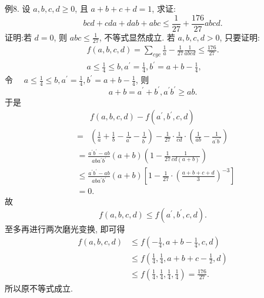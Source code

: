 例8. 设 $a, b, c, d \geqslant 0$, 且 $a+b+c+d=1$, 求证:
$$
b c d+c d a+d a b+a b c \leqslant \frac{1}{27}+\frac{176}{27} a b c d .
$$
证明:若 $d=0$, 则 $a b c \leqslant \frac{1}{27}$, 不等式显然成立.
若 $a, b, c, d>0$, 只要证明:
$$
\begin{gathered}
f(a, b, c, d)=\sum_{c y c} \frac{1}{a}-\frac{1}{27} \frac{1}{a b c d} \leqslant \frac{176}{27} . \\
a \leqslant \frac{1}{4} \leqslant b, a^{\prime}=\frac{1}{4}, b^{\prime}=a+b-\frac{1}{4},
\end{gathered}
$$
令 $\quad a \leqslant \frac{1}{4} \leqslant b, a^{\prime}=\frac{1}{4}, b^{\prime}=a+b-\frac{1}{4}$,
则
$$
a+b=a^{\prime}+b^{\prime}, a^{\prime} b^{\prime} \geqslant a b .
$$
于是
$$
\begin{aligned}
& f(a, b, c, d)-f\left(a^{\prime}, b^{\prime}, c, d\right) \\
= & \left(\frac{1}{a}+\frac{1}{b}-\frac{1}{a^{\prime}}-\frac{1}{b^{\prime}}\right)-\frac{1}{27} \cdot \frac{1}{c d} \cdot\left(\frac{1}{a b}-\frac{1}{a^{\prime} b^{\prime}}\right)
\end{aligned}
$$
$$
\begin{aligned}
& =\frac{a^{\prime} b^{\prime}-a b}{a b a^{\prime} b^{\prime}}(a+b)\left(1-\frac{1}{27} \frac{1}{c d(a+b)}\right) \\
& \leqslant \frac{a^{\prime} b^{\prime}-a b}{a b a^{\prime} b^{\prime}}(a+b)\left[1-\frac{1}{27} \cdot\left(\frac{a+b+c+d}{3}\right)^{-3}\right] \\
& =0 .
\end{aligned}
$$
故
$$
f(a, b, c, d) \leqslant f\left(a^{\prime}, b^{\prime}, c, d\right) .
$$
至多再进行两次磨光变换, 即可得
$$
\begin{aligned}
f(a, b, c, d) & \leqslant f\left(-\frac{1}{4}, a+b-\frac{1}{4}, c, d\right) \\
& \leqslant f\left(\frac{1}{4}, \frac{1}{4}, a+b+c-\frac{1}{2}, d\right) \\
& \leqslant f\left(\frac{1}{4}, \frac{1}{4}, \frac{1}{4}, \frac{1}{4}\right)=\frac{176}{27} .
\end{aligned}
$$
所以原不等式成立.



